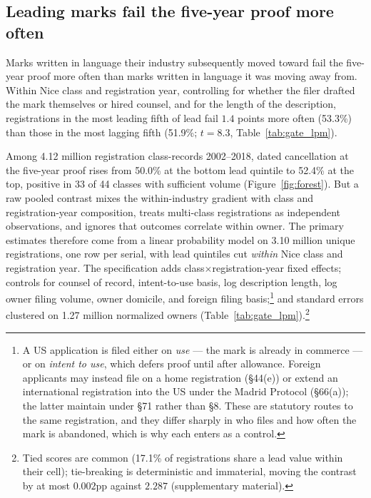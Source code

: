 \subsection{Leading marks fail the five-year proof more often}\label{sec:gate_headline}

Marks written in language their industry subsequently moved toward fail
the five-year proof more often than marks written in language it was
moving away from. Within Nice class and registration year, controlling for
whether the filer drafted the mark themselves or hired counsel, and for
the length of the description, registrations in the most leading fifth of
lead fail $1.4$ points more often (53.3\%) than those in the most lagging
fifth (51.9\%; $t = 8.3$, Table~\ref{tab:gate_lpm}).

Among 4.12 million registration class-records 2002--2018, dated
cancellation at the five-year proof rises from 50.0\% at the bottom
lead quintile to 52.4\% at the top, positive in 33 of 44 classes with
sufficient volume (Figure~\ref{fig:forest}). But a raw pooled contrast
mixes the within-industry gradient with class and registration-year
composition, treats multi-class registrations as independent observations,
and ignores that outcomes correlate within owner. The primary estimates
therefore come from a linear probability model on 3.10 million unique
registrations, one row per serial, with lead quintiles cut \emph{within}
Nice class and registration year. The specification adds
class$\times$registration-year fixed effects; controls for counsel of
record, intent-to-use basis, log description length, log owner filing
volume, owner domicile, and foreign filing basis;\footnote{A US
application is filed either on \emph{use} --- the mark is already in
commerce --- or on \emph{intent to use}, which defers proof until after
allowance. Foreign applicants may instead file on a home registration
(\S44(e)) or extend an international registration into the US under the
Madrid Protocol (\S66(a)); the latter maintain under \S71 rather than
\S8. These are statutory routes to the same registration, and they differ
sharply in who files and how often the mark is abandoned, which is why
each enters as a control.} and standard errors clustered on 1.27 million
normalized owners (Table~\ref{tab:gate_lpm}).\footnote{Tied scores are common (17.1\% of registrations share a lead
value within their cell); tie-breaking is deterministic and immaterial,
moving the contrast by at most $0.002$pp against $2.287$ (supplementary
material).}

